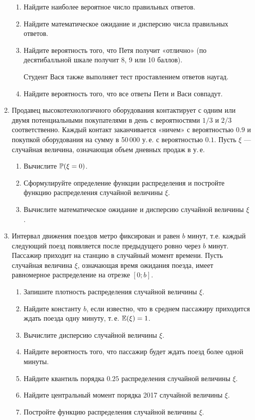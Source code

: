 \begin{enumerate}
\begin{enumerate}
\item	Найдите наиболее вероятное число правильных ответов.
\item	Найдите математическое ожидание и дисперсию числа правильных ответов.
\item	Найдите вероятность того, что Петя получит «отлично»
(по десятибалльной шкале получит 8, 9 или 10 баллов).

Студент Вася также выполняет тест проставлением ответов наугад.

\item	Найдите вероятность того, что все ответы Пети и Васи совпадут.
\end{enumerate}

\item  Продавец высокотехнологичного оборудования контактирует с одним или двумя
потенциальными покупателями в день с вероятностями $1/3$ и $2/3$ соответственно.
Каждый контакт заканчивается «ничем» с вероятностью $0.9$ и покупкой оборудования
на сумму в 50\,000 у.\,е. с вероятностью $0.1$.
Пусть $\xi$ — случайная величина, означающая объем дневных продаж в у.\,е.

\begin{enumerate}
\item	Вычислите  $\P(\xi = 0)$.
\item	Сформулируйте определение функции распределения и постройте функцию распределения
случайной величины $\xi$.
\item	Вычислите математическое ожидание и дисперсию случайной величины $\xi$.
\end{enumerate}

\item Интервал движения поездов метро фиксирован и равен $b$ минут,
т.е. каждый следующий поезд появляется после предыдущего ровно через $b$ минут.
Пассажир приходит на станцию в случайный момент времени.
Пусть случайная величина $\xi$, означающая время ожидания поезда,
имеет равномерное распределение на отрезке $[0; b]$.

\begin{enumerate}
\item Запишите плотность распределения случайной величины $\xi$.
\item	Найдите константу $b$, если известно, что в среднем пассажиру приходится
ждать поезда одну минуту, т.\,е. $\E(\xi) = 1$.
\item	Вычислите дисперсию случайной величины $\xi$.
\item	Найдите вероятность того, что пассажир будет ждать поезд более одной минуты.
\item	Найдите квантиль порядка $0.25$ распределения случайной величины $\xi$.
\item	Найдите центральный момент порядка 2017 случайной величины $\xi$.
\item	Постройте функцию распределения случайной величины $\xi$.


\end{enumerate}
\end{enumerate}
